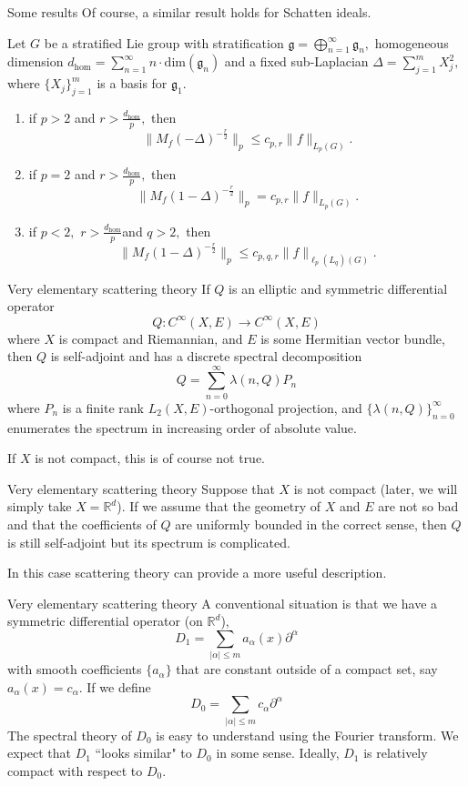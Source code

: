\documentclass{beamer}
\numberwithin{equation}{section}
\theoremstyle{plain}
\theoremstyle{plain}
\theoremstyle{definition}
\theoremstyle{plain}
\theoremstyle{plain}
\theoremstyle{definition}
\newcommand{\Rl}{\mathbb{R}}
\newcommand{\gf}{\mathfrak{g}}
\begin{document}
\begin{frame}{Some results}
Of course, a similar result holds for Schatten ideals.

\begin{theorem}\label{cwikel schatten_theorem}
Let $G$ be a stratified Lie group with stratification $\gf = \bigoplus_{n=1}^\infty \gf_n,$ homogeneous dimension $d_{\hom} = \sum_{n=1}^\infty n\cdot \mathrm{dim}(\gf_n)$ and a fixed sub-Laplacian $\Delta = \sum_{j=1}^m X_j^2,$ where $\{X_j\}_{j=1}^m$ is a basis for $\gf_1.$
\begin{enumerate}[{\rm (i)}]
\item if $p>2$ and $r>\frac{d_{\hom}}{p},$ then
$$\|M_f(-\Delta)^{-\frac{r}{2}}\|_p\leq c_{p,r}\|f\|_{L_p(G)}.$$
\item if $p=2$ and $r>\frac{d_{\hom}}{p},$ then
$$\|M_f(1-\Delta)^{-\frac{r}{2}}\|_p=c_{p,r}\|f\|_{L_p(G)}.$$
\item if $p<2,$ $r>\frac{d_{\hom}}{p}$and $q>2,$ then
$$\|M_f(1-\Delta)^{-\frac{r}{2}}\|_p\leq c_{p,q,r}\|f\|_{\ell_p(L_q)(G)}.$$
\end{enumerate}
\end{theorem}
\end{frame}


\begin{frame}{Very elementary scattering theory}
  If $Q$ is an elliptic and symmetric differential operator
  \[
     Q:C^{\infty}(X,E)\to C^\infty(X,E)
  \]
  where $X$ is compact and Riemannian, and $E$ is some Hermitian vector bundle, then $Q$ is self-adjoint and has a discrete spectral decomposition
  \[
     Q = \sum_{n=0}^\infty \lambda(n,Q)P_n
  \]
  where $P_n$ is a finite rank $L_2(X,E)$-orthogonal projection, and $\{\lambda(n,Q)\}_{n=0}^\infty$ enumerates the spectrum in increasing order of absolute value.

  \pause

  If $X$ is not compact, this is of course not true.
\end{frame}

\begin{frame}{Very elementary scattering theory}
  Suppose that $X$ is not compact (later, we will simply take $X = \Rl^d$). If we assume that the geometry of $X$ and $E$ are not so bad and that the coefficients of $Q$ are uniformly bounded in the correct sense, then $Q$ is still self-adjoint but its spectrum is complicated.

  \pause
  In this case scattering theory can provide a more useful description.
\end{frame}

\begin{frame}{Very elementary scattering theory}
  A conventional situation is that we have a symmetric differential operator (on $\Rl^d$),
  \[
      D_1 = \sum_{|\alpha|\leq m} a_{\alpha}(x)\partial^{\alpha}
  \]
  with smooth coefficients $\{a_{\alpha}\}$ that are constant outside of a compact set, say $a_{\alpha}(x) = c_{\alpha}.$ If we define
  \[
      D_0 = \sum_{|\alpha|\leq m} c_{\alpha}\partial^{\alpha}
  \]
  The spectral theory of $D_0$ is easy to understand using the Fourier transform. We expect that $D_1$ ``looks similar"
  to $D_0$ in some sense. Ideally, $D_1$ is relatively compact with respect to $D_0.$
\end{frame}
\end{document}
